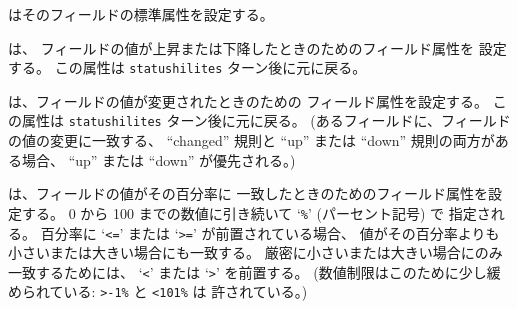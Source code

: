 \blist{}
\item[{\tt always}] はそのフィールドの標準属性を設定する。
\item[{\tt up}, {\tt down}] は、
フィールドの値が上昇または下降したときのためのフィールド属性を
設定する。
この属性は {\tt statushilites} ターン後に元に戻る。
\item[{\tt changed}] は、フィールドの値が変更されたときのための
フィールド属性を設定する。
この属性は {\tt statushilites} ターン後に元に戻る。
(あるフィールドに、フィールドの値の変更に一致する、
``changed'' 規則と ``up'' または ``down'' 規則の両方がある場合、
``up'' または ``down'' が優先される。)
\item[{\tt percentage}] は、フィールドの値がその百分率に
一致したときのためのフィールド属性を設定する。
0 から 100 までの数値に引き続いて `{\tt \%}' (パーセント記号) で
指定される。
百分率に `{\tt <=}' または `{\tt >=}' が前置されている場合、
値がその百分率よりも小さいまたは大きい場合にも一致する。
厳密に小さいまたは大きい場合にのみ一致するためには、
`{\tt <}' または `{\tt >}' を前置する。
(数値制限はこのために少し緩められている: {\tt >-1\%} と {\tt <101\%} は
許されている。)

